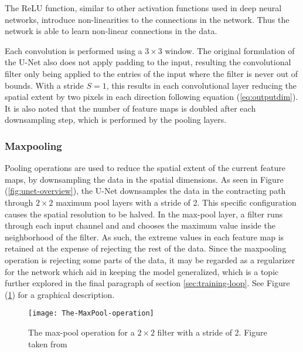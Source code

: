 \documentclass[../main/thesis.tex]{subfiles}
\begin{document}
The ReLU function, similar to other activation functions used in deep neural networks, introduce non-linearities to the connections in the network. Thus the network is able to learn non-linear connections in the data.

Each convolution is performed using a $3 \times 3$ window. The original formulation of the U-Net also does not apply padding to the input, resulting the convolutional filter only being applied to the entries of the input where the filter is never out of bounds. With a stride $S=1$, this results in each convolutional layer reducing the spatial extent by two pixels in each direction following equation (\ref{eq:outputdim}). It is also noted that the number of feature maps is doubled after each downsampling step, which is performed by the pooling layers.

\subsubsection{Maxpooling}
\label{sec:maxpool}
Pooling operations are used to reduce the spatial extent of the current feature maps, by downsampling the data in the spatial dimensions. As seen in Figure (\ref{fig:unet-overview}), the U-Net downsamples the data in the contracting path through $2 \times 2$ maximum pool layers with a stride of 2. This specific configuration causes the spatial resolution to be halved. In the max-pool layer, a filter runs through each input channel and and chooses the maximum value inside the neighborhood of the filter. As such, the extreme values in each feature map is retained at the expense of rejecting the rest of the data. Since the maxpooling operation is rejecting some parts of the data, it may be regarded as a regularizer for the network which aid in keeping the model generalized, which is a topic further explored in the final paragraph of section \ref{sec:training-loop}. See Figure (\ref{fig:maxpool}) for a graphical description.

\begin{figure}
    \centering
    \texttt{[image: The-MaxPool-operation]}
    \caption{\label{fig:maxpool}The max-pool operation for a $2 \times 2$ filter with a stride of 2. Figure taken from \protect\citep{MihaiDaniel2020}}
\end{figure}
\end{document}
